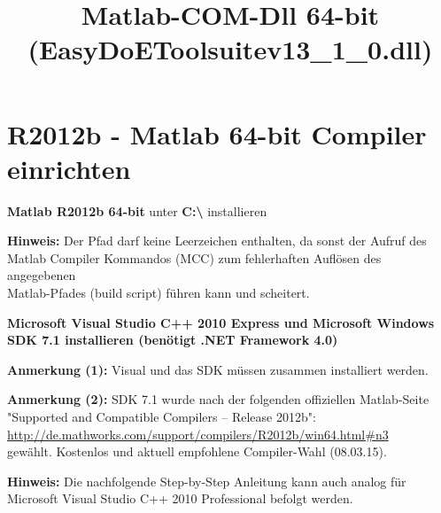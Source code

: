\documentclass[a4paper,11pt]{article}
\title{Matlab-COM-Dll 64-bit (EasyDoEToolsuitev13\_1\_0.dll)}
\begin{document}
\date{\vspace{-8ex}}  %
\author{ }             %
\maketitle

\section*{R2012b - Matlab 64-bit Compiler einrichten}

\begin{compiler}
	\item \textbf{Matlab R2012b 64-bit} unter \textbf{C:\textbackslash{}} installieren
	\begin{compiler}
		\item \textbf{Hinweis:} Der Pfad darf keine Leerzeichen enthalten, da sonst der Aufruf des
		\\ Matlab Compiler Kommandos (MCC) zum fehlerhaften Auflösen des angegebenen
		\\ Matlab-Pfades (build script) führen kann und scheitert.
	\end{compiler}
	
	\item \textbf{Microsoft Visual Studio C++ 2010 Express und Microsoft Windows 
	\\ SDK 7.1 installieren (benötigt .NET Framework 4.0) }
	\begin{compiler}
		\item \textbf{Anmerkung (1):} Visual und das SDK müssen zusammen installiert werden.
		
		\item \textbf{Anmerkung (2):} SDK 7.1 wurde nach der folgenden offiziellen Matlab-Seite
		\\ "Supported and Compatible Compilers – Release 2012b": 
		\\ \url{http://de.mathworks.com/support/compilers/R2012b/win64.html#n3}
		\\ gewählt. Kostenlos und aktuell empfohlene Compiler-Wahl (08.03.15).
		
		\item \textbf{Hinweis:} Die nachfolgende Step-by-Step Anleitung kann auch analog für 
		\\Microsoft Visual Studio C++ 2010 Professional befolgt werden.
	\end{compiler}	
\end{compiler}
\end{document}
